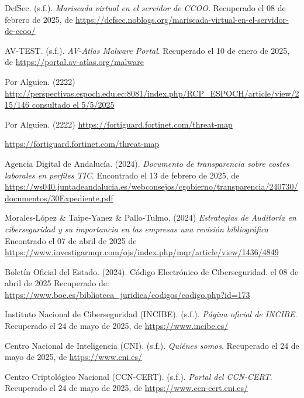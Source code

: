 \documentclass[a4paper, 10pt]{article}
\begin{document}
\begin{thebibliography}{20}
    
    DefSec. (s.f.). \textit{Mariscada virtual en el servidor de CCOO}. Recuperado el 08 de febrero de 2025, de \url{https://defsec.noblogs.org/mariscada-virtual-en-el-servidor-de-ccoo/}
    
    AV-TEST. (s.f.). \textit{AV-Atlas Malware Portal}. Recuperado el 10 de enero de 2025, de \url{https://portal.av-atlas.org/malware}
    
    Por Alguien. (2222) \url{http://perspectivas.espoch.edu.ec:8081/index.php/RCP_ESPOCH/article/view/215/146 consultado el 5/5/2025}
    

    Por Alguien. (2222) \url{https://fortiguard.fortinet.com/threat-map}
    
    \url{https://fortiguard.fortinet.com/threat-map}
    


    Agencia Digital de Andalucía. (2024). \textit{Documento de transparencia sobre costes laborales en perfiles TIC}. Encontrado el 13 de febrero de 2025, de \url{https://ws040.juntadeandalucia.es/webconsejos/cgobierno/transparencia/240730/documentos/30Expediente.pdf}
    
    Morales-López \& Taipe-Yanez \& Pallo-Tulmo, (2024) \textit{Estrategias de Auditoría en ciberseguridad y su importancia en las empresas una revisión bibliográfica} Encontrado el 07 de abril de 2025 de \url{https://www.investigarmqr.com/ojs/index.php/mqr/article/view/1436/4849}

    Boletín Oficial del Estado. (2024). Código Electrónico de Ciberseguridad. el 08 de abril de 2025 Recuperado de: \url{https://www.boe.es/biblioteca_juridica/codigos/codigo.php?id=173}

Instituto Nacional de Ciberseguridad (INCIBE). (s.f.). \textit{Página oficial de INCIBE}. Recuperado el 24 de mayo de 2025, de \url{https://www.incibe.es/}

Centro Nacional de Inteligencia (CNI). (s.f.). \textit{Quiénes somos}. Recuperado el 24 de mayo de 2025, de \url{https://www.cni.es/}

Centro Criptológico Nacional (CCN-CERT). (s.f.). \textit{Portal del CCN-CERT}. Recuperado el 24 de mayo de 2025, de \url{https://www.ccn-cert.cni.es/}


\end{thebibliography}
\end{document}
